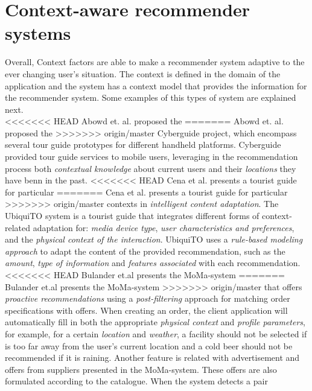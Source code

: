 \section{Context-aware recommender systems} 
Overall, Context factors are able to make a recommender system 
adaptive to the ever changing user's situation. The
context is defined in the domain of the application and the system has
a context model that provides the information for the recommender
system. Some  examples of this types of system are explained
next. \\
<<<<<<< HEAD
Abowd et. al. \cite{abowd1997cyberguide} proposed the
=======
Abowd et. al.\cite{abowd1997cyberguide} proposed the
>>>>>>> origin/master
Cyberguide project, which encompass several tour 
guide prototypes for different handheld platforms. 
Cyberguide provided tour guide services to mobile users,
leveraging in the recommendation process both 
\textit{contextual knowledge} about current users and their 
\textit{locations} they have benn in the past. 
<<<<<<< HEAD
Cena et al. \cite{cena2006integrating} presents a tourist guide for particular 
=======
Cena et al.\cite{cena2006integrating} presents a tourist guide for particular 
>>>>>>> origin/master
contexts in \textit{intelligent content adaptation}. The UbiquiTO system is a
tourist guide that integrates different forms of context-related
adaptation for: \textit{media device type}, \textit{user characteristics and
preferences}, and the \textit{physical context of the interaction}. UbiquiTO uses
a \textit{rule-based modeling approach} to adapt the content of the provided
recommendation, such as the \textit{amount}, \textit{type of information} and 
\textit{features associated} with each recommendation. 
<<<<<<< HEAD
Bulander et.al \cite{bulander2005comparison} presents the MoMa-system 
=======
Bulander et.al\cite{bulander2005comparison} presents the MoMa-system 
>>>>>>> origin/master
that offers \textit{proactive recommendations} using a \textit{post-filtering} 
approach for matching order specifications with offers. 
When creating an order, the client application will automatically fill in both the 
appropriate \textit{physical context} and \textit{profile parameters}, for example, 
for a certain \textit{location} and \textit{weather}, a facility should not be selected
if is too far away from the user's current location and a cold beer should not be
recommended if it is raining. Another feature is related with 
advertisement and offers from suppliers presented in the MoMa-system. These offers are also
formulated according to the catalogue. When the system detects a pair
